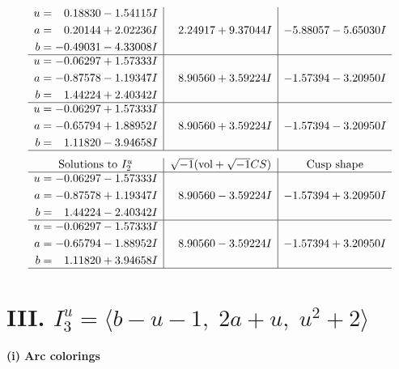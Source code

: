\documentclass[1p]{elsarticle_modified}
\theoremstyle{definition}
\newcommand{\I}{\sqrt{-1}}
\begin{document}
$$\begin{array}{c|c|c}
\begin{aligned}
u &= \phantom{-}0.18830 - 1.54115 I \\
a &= \phantom{-}0.20144 + 2.02236 I \\
b &= -0.49031 - 4.33008 I\end{aligned}
 & \phantom{-}2.24917 + 9.37044 I & -5.88057 - 5.65030 I \\ \hline\begin{aligned}
u &= -0.06297 + 1.57333 I \\
a &= -0.87578 - 1.19347 I \\
b &= \phantom{-}1.44224 + 2.40342 I\end{aligned}
 & \phantom{-}8.90560 + 3.59224 I & -1.57394 - 3.20950 I \\ \hline\begin{aligned}
u &= -0.06297 + 1.57333 I \\
a &= -0.65794 + 1.88952 I \\
b &= \phantom{-}1.11820 - 3.94658 I\end{aligned}
 & \phantom{-}8.90560 + 3.59224 I & -1.57394 - 3.20950 I\\
 \hline 
 \end{array}$$\newpage$$\begin{array}{c|c|c}  
\text{Solutions to }I^u_{2}& \I (\text{vol} + \sqrt{-1}CS) & \text{Cusp shape}\\
 \hline 
\begin{aligned}
u &= -0.06297 - 1.57333 I \\
a &= -0.87578 + 1.19347 I \\
b &= \phantom{-}1.44224 - 2.40342 I\end{aligned}
 & \phantom{-}8.90560 - 3.59224 I & -1.57394 + 3.20950 I \\ \hline\begin{aligned}
u &= -0.06297 - 1.57333 I \\
a &= -0.65794 - 1.88952 I \\
b &= \phantom{-}1.11820 + 3.94658 I\end{aligned}
 & \phantom{-}8.90560 - 3.59224 I & -1.57394 + 3.20950 I\\
 \hline 
 \end{array}$$\newpage\newpage\renewcommand{\arraystretch}{1}
\centering \section*{III. $I^u_{3}= \langle b- u-1,\;2 a+u,\;u^2+2 \rangle$}
\flushleft \textbf{(i) Arc colorings}\\
\end{document}
